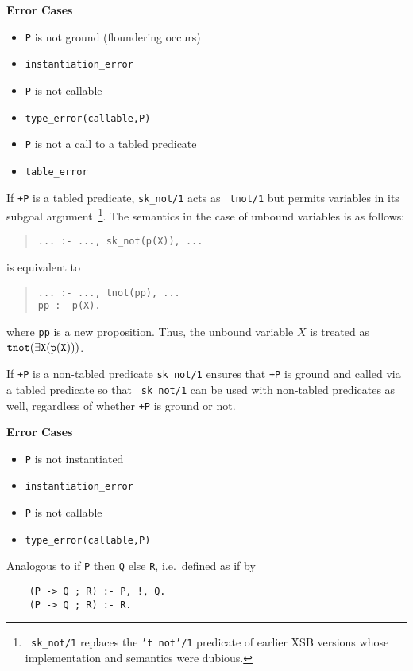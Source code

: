 \begin{description}
{\bf Error Cases}
\begin{itemize}
\item	{\tt P} is not ground (floundering occurs)
\bi
    \item {\tt instantiation\_error}
\ei
\item	{\tt P} is not callable
\bi
     \item {\tt type\_error(callable,P)}
\ei
\item {\tt P} is not a call to a tabled predicate
\bi
     \item{\tt table\_error}
\ei
\end{itemize}

If {\tt +P} is a tabled predicate, {\tt sk\_not/1} acts as {\tt
  tnot/1} but permits variables in its subgoal argument~\footnote{{\tt
    sk\_not/1} replaces the {\tt 't not'/1} predicate of earlier XSB
  versions whose implementation and semantics were dubious.}. The
semantics in the case of unbound variables is as follows:
\begin{quote} 
\tt ... :- ...,~sk\_not(p(X)),~...  \end{quote} 
is equivalent to 
\begin{quote}
 \tt ... :- ..., tnot(pp),~...\\ pp :- p(X).
\end{quote} 
where {\tt pp} is a new proposition. Thus, the unbound variable $X$ is
treated as $\tt tnot(\exists X (p(X)))$.

If {\tt +P} is a non-tabled predicate {\tt sk\_not/1} ensures that
{\tt +P} is ground and called via a tabled predicate so that {\tt
  sk\_not/1} can be used with non-tabled predicates as well,
regardless of whether {\tt +P} is ground or not.

{\bf Error Cases}
\begin{itemize}
\item	{\tt P} is not instantiated
\bi
    \item {\tt instantiation\_error}
\ei
\item	{\tt P} is not callable
\bi
     \item {\tt type\_error(callable,P)}
\ei
\end{itemize}

    Analogous to if {\tt P} then {\tt Q} else {\tt R}, i.e.\ defined as 
    if by
	\begin{center}
	\begin{minipage}{2.10in}
	\begin{verbatim}
	(P -> Q ; R) :- P, !, Q.
	(P -> Q ; R) :- R.
	\end{verbatim}
	\end{minipage}
	\end{center}


\end{description}
